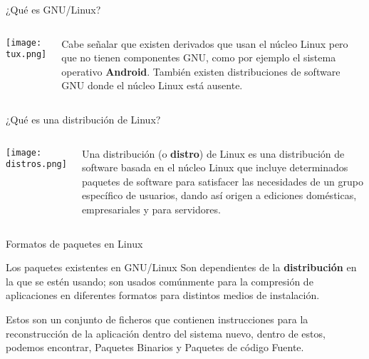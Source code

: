 \begin{frame}[c]{¿Qué es GNU/Linux?}
    \begin{columns}
        \begin{center}
            \texttt{[image: tux.png]}
        \end{center}
        Cabe señalar que existen derivados que usan el núcleo Linux pero que
        no tienen componentes GNU, como por ejemplo el sistema operativo
        \textbf{Android}. También existen distribuciones de software GNU
        donde el núcleo Linux está ausente.
    \end{columns}
\end{frame}

\begin{frame}[c]{¿Qué es una distribución de Linux?}
    \begin{columns}
        \begin{center}
            \texttt{[image: distros.png]}
        \end{center}
        \pausa
        Una distribución (o \textbf{distro}) de Linux es una distribución
        de software basada en
        el núcleo Linux que incluye determinados paquetes de software para
        satisfacer las necesidades de un grupo específico de usuarios,
        dando así origen a ediciones domésticas, empresariales y para
        servidores.
    \end{columns}
\end{frame}

\begin{frame}[c]{Formatos de paquetes en Linux}

  \begin{block}{Los paquetes existentes en GNU/Linux}
    Son dependientes de la
    \textbf{distribución} en la que se estén usando; son usados comúnmente
    para la compresión de aplicaciones en diferentes formatos para
    distintos medios de instalación.
  \end{block}

  \vspace{\baselineskip}
  Estos son un conjunto de ficheros que contienen instrucciones para la
  reconstrucción de la aplicación dentro del sistema nuevo, dentro de estos,
  podemos encontrar, Paquetes Binarios y Paquetes de código Fuente.
\end{frame}

